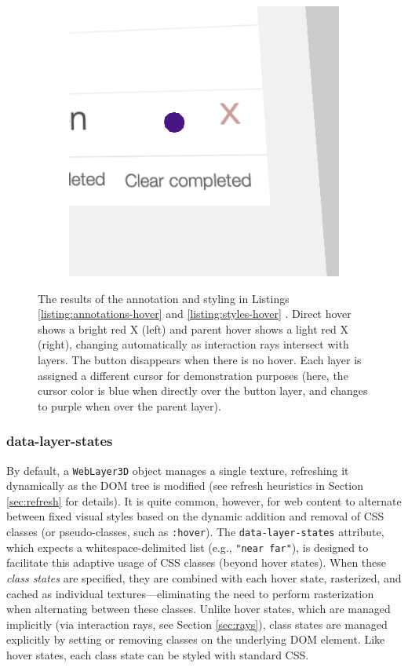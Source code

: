 \documentclass[sigconf]{acmart}
\begin{document}
\begin{figure}[H]
\begin{subfigure}{0.48\linewidth}
    \includegraphics[trim={16px 30px 0 30px},clip, width=\linewidth]{TodoMVC-Hover-2.png}
    \end{subfigure}
  \caption{ The results of the annotation and styling in Listings \ref{listing:annotations-hover} and \ref{listing:styles-hover} . Direct hover shows a bright red X (left) and parent hover shows a light red X (right), changing automatically as interaction rays intersect with layers. The button disappears when there is no hover. Each layer is assigned a different cursor for demonstration purposes (here, the cursor color is blue when directly over the button layer, and changes to purple when over the parent layer).}
  \Description{}
  \label{fig:hover}
\end{figure}


\subsubsection{data-layer-states}
\label{sec:states}
By default, a \verb|WebLayer3D| object manages a single texture, refreshing it dynamically as the DOM tree is modified (see refresh heuristics in Section \ref{sec:refresh} for details). It is quite common, however, for web content to alternate between fixed visual styles based on the dynamic addition and removal of CSS classes (or pseudo-classes, such as \verb|:hover|). The \verb|data-layer-states| attribute, which expects a whitespace-delimited list (e.g., \verb|"near far"|), is designed to facilitate this adaptive usage of CSS classes (beyond hover states). When these \textit{class states} are specified, they are combined with each hover state, rasterized, and cached as individual textures---eliminating the need to perform rasterization when alternating between these classes. Unlike hover states, which are managed implicitly (via interaction rays, see Section \ref{sec:rays}), class states are managed explicitly by setting or removing classes on the underlying DOM element. Like hover states, each class state can be styled with standard CSS.
\end{document}
